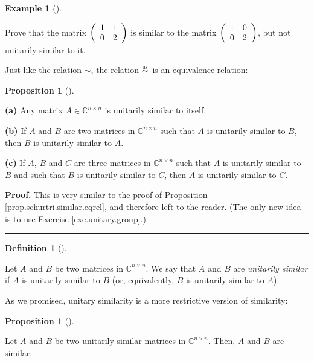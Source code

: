 \documentclass[numbers=enddot,12pt,final,onecolumn,notitlepage]{scrartcl}%
\numberwithin{exer}{subsection}
\theoremstyle{definition}
\newtheorem{prop}[theo]{Proposition}
\newenvironment{proposition}[1][]
{\begin{prop}[#1]\begin{leftbar}}
{\end{leftbar}\end{prop}}
\newtheorem{defi}[theo]{Definition}
\newenvironment{definition}[1][]
{\begin{defi}[#1]\begin{leftbar}}
{\end{leftbar}\end{defi}}
\newtheorem{exam}[theo]{Example}
\newenvironment{example}[1][]
{\begin{exam}[#1]\begin{leftbar}}
{\end{leftbar}\end{exam}}
\newenvironment{proof}[1][Proof]{\noindent\textbf{#1.} }{\ \rule{0.5em}{0.5em}}
\begin{document}
\begin{example}
\label{exe.schurtri.unisim.two2x2} Prove that the matrix $\left(
\begin{array}
[c]{cc}%
1 & 1\\
0 & 2
\end{array}
\right)  $ is similar to the matrix $\left(
\begin{array}
[c]{cc}%
1 & 0\\
0 & 2
\end{array}
\right)  $, but not unitarily similar to it.
\end{example}

Just like the relation $\sim$, the relation $\overset{\operatorname*{us}%
}{\sim}$\ is an equivalence relation:

\begin{proposition}
\label{prop.schurtri.unisim.eqrel}\textbf{(a)} Any matrix $A\in\mathbb{C}%
^{n\times n}$ is unitarily similar to itself. \medskip

\textbf{(b)} If $A$ and $B$ are two matrices in $\mathbb{C}^{n\times n}$ such
that $A$ is unitarily similar to $B$, then $B$ is unitarily similar to $A$.
\medskip

\textbf{(c)} If $A$, $B$ and $C$ are three matrices in $\mathbb{C}^{n\times
n}$ such that $A$ is unitarily similar to $B$ and such that $B$ is unitarily
similar to $C$, then $A$ is unitarily similar to $C$.
\end{proposition}

\begin{proof}
This is very similar to the proof of Proposition
\ref{prop.schurtri.similar.eqrel}, and therefore left to the reader. (The only
new idea is to use Exercise \ref{exe.unitary.group}.)
\end{proof}

\begin{definition}
Let $A$ and $B$ be two matrices in $\mathbb{C}^{n\times n}$. We say that $A$
and $B$ are \emph{unitarily similar} if $A$ is unitarily similar to $B$ (or,
equivalently, $B$ is unitarily similar to $A$).
\end{definition}

As we promised, unitary similarity is a more restrictive version of similarity:

\begin{proposition}
\label{prop.schurtri.unisim.sim}Let $A$ and $B$ be two unitarily similar
matrices in $\mathbb{C}^{n\times n}$. Then, $A$ and $B$ are similar.
\end{proposition}
\end{document}
